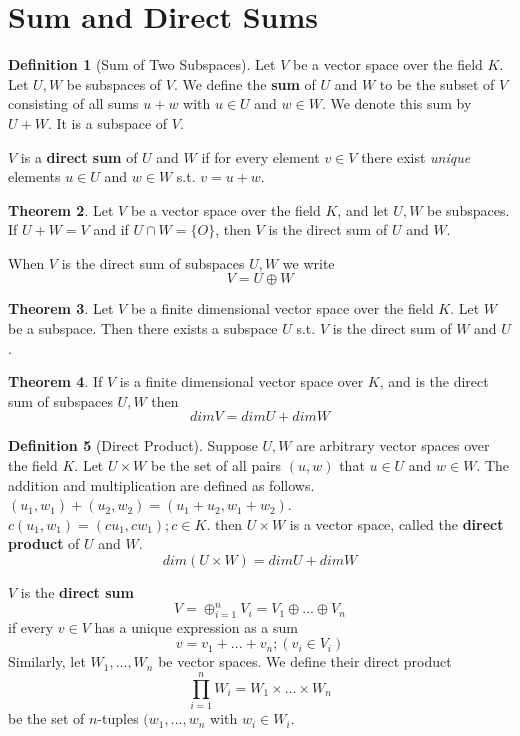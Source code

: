\documentclass{book}
\theoremstyle{definition}
\newtheorem{definition}{Definition}[section]
\newtheorem{theorem}[definition]{Theorem}
\begin{document}
\section{Sum and Direct Sums}
\begin{definition}[Sum of Two Subspaces]
    Let $V$ be a vector space over the field $K$. Let $U,W$ be subspaces of $V$. We define the \textbf{sum} of $U$ and $W$ to be the subset of $V$ consisting of all sums $u+w$ with $u \in U$ and $w \in W$. We denote this sum by $U+W$. It is a subspace of $V$.
\end{definition}
$V$ is a \textbf{direct sum} of $U$ and $W$ if for every element $v \in V$ there exist \textit{unique} elements $u \in U$ and $w \in W$ s.t. $v = u + w$.
\begin{theorem}
Let $V$ be a vector space over the field $K$, and let $U,W$ be subspaces. If $U+W=V$ and if $U \cap W = \{O\}$, then $V$ is the direct sum of $U$ and $W$.
\end{theorem}
When $V$ is the direct sum of subspaces $U,W$ we write
\begin{equation*}
    V = U \oplus W
\end{equation*}
\begin{theorem}
Let $V$ be a finite dimensional vector space over the field $K$. Let $W$ be a subspace. Then there exists a subspace $U$ s.t. $V$ is the direct sum of $W$ and $U$.
\end{theorem}
\begin{theorem}
If $V$ is a finite dimensional vector space over $K$, and is the direct sum of subspaces $U,W$ then
\begin{equation*}
    dim V = dim U + dim W
\end{equation*}
\end{theorem}
\begin{definition}[Direct Product]
    Suppose $U,W$ are arbitrary vector spaces over the field $K$. Let $U \times W$ be the set of all pairs $(u,w)$ that $u \in U$ and $w \in W$. The addition and multiplication are defined as follows.
    \\ $(u_1, w_1) + (u_2, w_2) = (u_1 + u_2, w_1 + w_2)$.
    \\ $c(u_1, w_1) = (cu_1, cw_1); c \in K$.
    then $U \times W$ is a vector space, called the \textbf{direct product} of $U$ and $W$.
    \begin{equation*}
        dim(U \times W) = dim U + dim W 
    \end{equation*}
\end{definition}
$V$ is the \textbf{direct sum}
\begin{equation*}
    V = \oplus_{i=1}^n V_i = V_1 \oplus ... \oplus V_n
\end{equation*}
if every $v \in V$ has a unique expression as a sum
\begin{equation*}
    v = v_1 + ... + v_n; (v_i \in V_i)
\end{equation*}
Similarly, let $W_1, ..., W_n$ be vector spaces. We define their direct product
\begin{equation*}
    \prod_{i=1}^n W_i = W_1 \times ... \times W_n
\end{equation*}
be the set of $n$-tuples $(w_1,...,w_n$ with $w_i \in W_i$.
\end{document}
